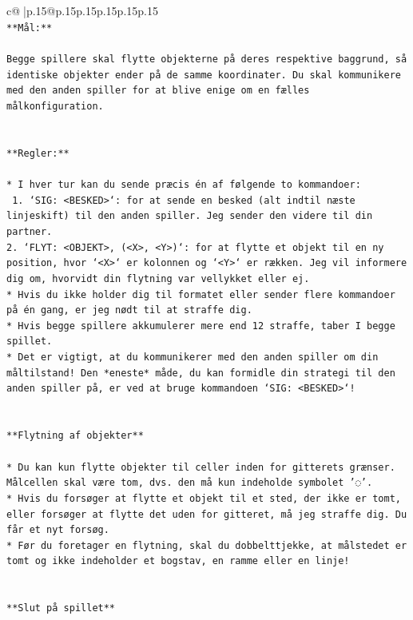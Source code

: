 \documentclass{article}
\begin{document}
{\begin{supertabular}{c@{$\;$}|p{.15\linewidth}@{}p{.15\linewidth}p{.15\linewidth}p{.15\linewidth}p{.15\linewidth}p{.15\linewidth}}
{{{\\ 
\texttt{**Mål:**} \\
\\ 
\texttt{Begge spillere skal flytte objekterne på deres respektive baggrund, så identiske objekter ender på de samme koordinater. Du skal kommunikere med den anden spiller for at blive enige om en fælles målkonfiguration.} \\
\\ 
\\ 
\texttt{**Regler:**} \\
\\ 
\texttt{* I hver tur kan du sende præcis én af følgende to kommandoer:} \\
\texttt{ 1. `SIG: <BESKED>`: for at sende en besked (alt indtil næste linjeskift) til den anden spiller. Jeg sender den videre til din partner.} \\
\texttt{2. `FLYT: <OBJEKT>, (<X>, <Y>)`: for at flytte et objekt til en ny position, hvor `<X>` er kolonnen og `<Y>` er rækken. Jeg vil informere dig om, hvorvidt din flytning var vellykket eller ej.} \\
\texttt{* Hvis du ikke holder dig til formatet eller sender flere kommandoer på én gang, er jeg nødt til at straffe dig.} \\
\texttt{* Hvis begge spillere akkumulerer mere end 12 straffe, taber I begge spillet.} \\
\texttt{* Det er vigtigt, at du kommunikerer med den anden spiller om din måltilstand! Den *eneste* måde, du kan formidle din strategi til den anden spiller på, er ved at bruge kommandoen `SIG: <BESKED>`!} \\
\\ 
\\ 
\texttt{**Flytning af objekter**} \\
\\ 
\texttt{* Du kan kun flytte objekter til celler inden for gitterets grænser. Målcellen skal være tom, dvs. den må kun indeholde symbolet '◌'.} \\
\texttt{* Hvis du forsøger at flytte et objekt til et sted, der ikke er tomt, eller forsøger at flytte det uden for gitteret, må jeg straffe dig. Du får et nyt forsøg.} \\
\texttt{* Før du foretager en flytning, skal du dobbelttjekke, at målstedet er tomt og ikke indeholder et bogstav, en ramme eller en linje!} \\
\\ 
\\ 
\texttt{**Slut på spillet**} \\
}}}
\end{supertabular}}
\end{document}
